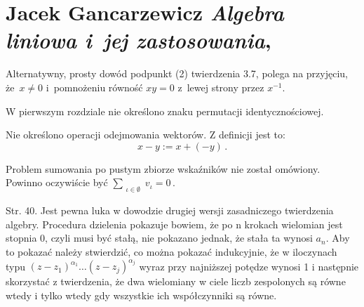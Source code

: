 \documentclass[a4paper,11pt]{article}
\numberwithin{equation}{section}
\begin{document}










\section{Jacek Gancarzewicz
  \textit{Algebra liniowa i~jej zastosowania},
  \cite{GancarzewiczAlgebraLiniowa2004}}

\vspace{0em}



\vspace{0em}


\noindent
{}

\VerSpaceFour





\noindent
{} Alternatywny, prosty dowód podpunkt (2) twierdzenia
3.7, polega na przyjęciu, że~$x \neq 0$ i~pomnożeniu równość $xy = 0$
z~lewej strony przez $x^{ -1 }$.

\VerSpaceFour





\noindent
W pierwszym rozdziale nie określono znaku permutacji identycznościowej.

\VerSpaceFour





\noindent
Nie określono operacji odejmowania wektorów. Z definicji jest
to:$$x - y := x + ( -y ) \, .$$

\VerSpaceFour





\noindent
Problem sumowania po pustym zbiorze wskaźników nie został omówiony.
Powinno oczywiście być $\sum_{ \substack{ \iota \in \emptyset } } v_{ \iota } = 0 \, .$

\VerSpaceFour





\noindent
Str. 40. Jest pewna luka w dowodzie drugiej wersji zasadniczego
twierdzenia algebry. Procedura dzielenia pokazuje bowiem, że po n
krokach wielomian jest stopnia 0, czyli musi być stałą, nie pokazano
jednak, że stała ta wynosi $a_{ n }$. Aby to pokazać należy
stwierdzić, co można pokazać indukcyjnie, że w iloczynach typu
$( z - z_{ 1 } )^{ \alpha_{ 1 } } \ldots( z - z_{ j } )^{ \alpha_{ j } }$
wyraz przy najniższej potędze wynosi 1 i następnie skorzystać z
twierdzenia, że dwa wielomiany w ciele liczb zespolonych są równe
wtedy i tylko wtedy gdy wszystkie ich współczynniki są równe.
\end{document}
